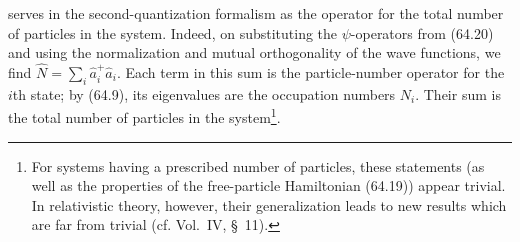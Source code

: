 serves in the second-quantization formalism as the operator for the total
number of particles in the system. Indeed, on substituting the
$\psi$-operators from (64.20) and using the normalization and mutual
orthogonality of the wave functions, we find
$\hat N=\sum_i\hat a_i^+\hat a_i$. Each term in this sum is the particle-number
operator for the $i$th state; by (64.9), its eigenvalues are the occupation
numbers $N_i$. Their sum is the total number of particles in the
system\footnote{For systems having a prescribed number of particles, these
statements (as well as the properties of the free-particle Hamiltonian
(64.19)) appear trivial. In relativistic theory, however, their generalization
leads to new results which are far from trivial (cf. Vol.~IV, \S~11).}.
